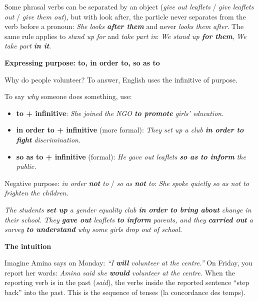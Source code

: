 \documentclass[11pt]{article}
\newcommand{\cle}[1]{{\popxbold\color{popdark}#1}}
\newcounter{popsec}
\newcounter{popsub}
\newcommand{\courssub}[1]{%
  \stepcounter{popsub}%
  \par\vspace{9pt}\noindent{\popxbold\fontsize{11.5}{13}\selectfont\color{popink}{\color{poporange}\thepopsec.\thepopsub}\hspace{6pt}#1}\par\nopagebreak\vspace{4pt}
}
\begin{document}
\begin{attention}
Some phrasal verbs can be separated by an object (\emph{give out leaflets} / \emph{give leaflets out} / \emph{give them out}), but with \cle{look after}, the particle never separates from the verb before a pronoun: \emph{She looks \textbf{after them}} and never \emph{looks them after}. The same rule applies to \emph{stand up for} and \emph{take part in}: \emph{We stand up \textbf{for them}}, \emph{We take part \textbf{in it}}.
\end{attention}

\textbf{Expressing purpose: to, in order to, so as to}\par

Why do people volunteer? To answer, English uses the infinitive of purpose.

\begin{aretenir}
To say \emph{why} someone does something, use:
\begin{itemize}
\item \textbf{to + infinitive}: \emph{She joined the NGO \textbf{to promote} girls' education.}
\item \textbf{in order to + infinitive} (more formal): \emph{They set up a club \textbf{in order to fight} discrimination.}
\item \textbf{so as to + infinitive} (formal): \emph{He gave out leaflets \textbf{so as to inform} the public.}
\end{itemize}
Negative purpose: \emph{in order \textbf{not} to} / \emph{so as \textbf{not} to}: \emph{She spoke quietly so as not to frighten the children.}
\end{aretenir}

\begin{exemplebox}
\emph{The students \textbf{set up} a gender equality club \textbf{in order to bring about} change in their school. They \textbf{gave out} leaflets \textbf{to inform} parents, and they \textbf{carried out} a survey \textbf{to understand} why some girls drop out of school.}
\end{exemplebox}

\courssub{Sequence of tenses}

\textbf{The intuition}\par

Imagine Amina says on Monday: \emph{``I \textbf{will} volunteer at the centre.''} On Friday, you report her words: \emph{Amina said she \textbf{would} volunteer at the centre.} When the reporting verb is in the past (\emph{said}), the verbs inside the reported sentence ``step back'' into the past. This is the \cle{sequence of tenses} (la concordance des temps).
\end{document}
